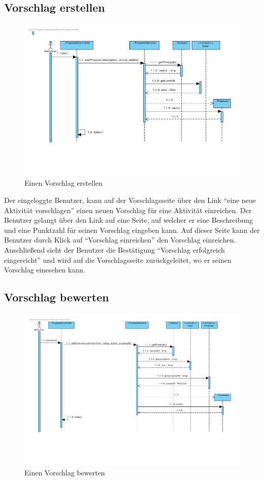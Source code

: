 \subsection{Vorschlag erstellen}
\begin{figure}[H]
  \centering
  \includegraphics[width=\textwidth, clip]{gfx/vorschlag_erstellen}
  \caption{Einen Vorschlag erstellen}
\end{figure}

Der eingeloggte Benutzer, kann auf der Vorschlagsseite über den Link
``eine neue Aktivität vorschlagen'' einen neuen Vorschlag für eine
Aktivität einreichen. Der Benutzer gelangt über den Link auf eine
Seite, auf welcher er eine Beschreibung und eine Punktzahl für seinen Vorschlag
 eingeben kann. Auf dieser Seite kann der Benutzer durch Klick auf
 ``Vorschlag einreichen'' den Vorschlag einreichen. Anschließend sieht
 der Benutzer die Bestätigung ``Vorschlag erfolgreich eingereicht''
 und wird auf die Vorschlagsseite zurückgeleitet, wo er seinen
 Vorschlag einesehen kann.
 
\subsection{Vorschlag bewerten}
\begin{figure}[H]
  \centering
  \includegraphics[width=\textwidth, clip]{gfx/vorschlag_bewerten}
  \caption{Einen Vorschlag bewerten}
\end{figure}

